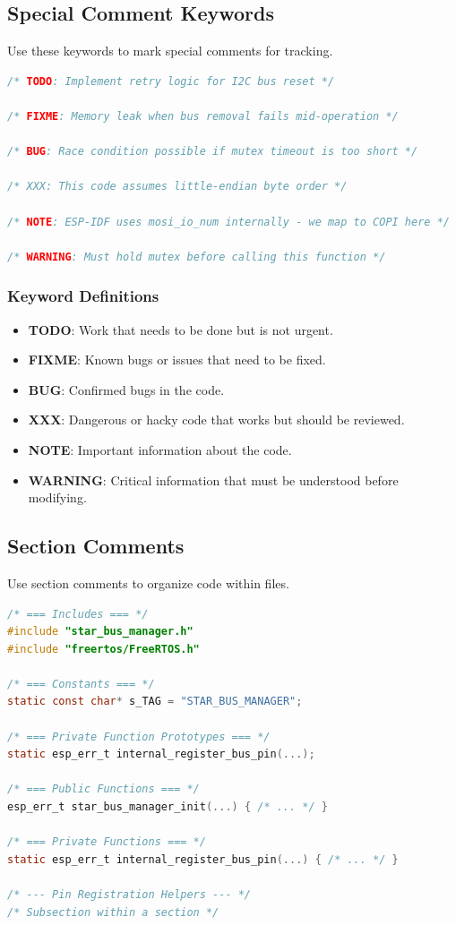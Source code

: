\subsection{Special Comment Keywords}

Use these keywords to mark special comments for tracking.

\begin{lstlisting}[language=C]
/* TODO: Implement retry logic for I2C bus reset */

/* FIXME: Memory leak when bus removal fails mid-operation */

/* BUG: Race condition possible if mutex timeout is too short */

/* XXX: This code assumes little-endian byte order */

/* NOTE: ESP-IDF uses mosi_io_num internally - we map to COPI here */

/* WARNING: Must hold mutex before calling this function */
\end{lstlisting}

\subsubsection{Keyword Definitions}

\begin{itemize}
    \item \textbf{TODO}: Work that needs to be done but is not urgent.
    \item \textbf{FIXME}: Known bugs or issues that need to be fixed.
    \item \textbf{BUG}: Confirmed bugs in the code.
    \item \textbf{XXX}: Dangerous or hacky code that works but should be reviewed.
    \item \textbf{NOTE}: Important information about the code.
    \item \textbf{WARNING}: Critical information that must be understood before modifying.
\end{itemize}

\subsection{Section Comments}

Use section comments to organize code within files.

\begin{lstlisting}[language=C]
/* === Includes === */
#include "star_bus_manager.h"
#include "freertos/FreeRTOS.h"

/* === Constants === */
static const char* s_TAG = "STAR_BUS_MANAGER";

/* === Private Function Prototypes === */
static esp_err_t internal_register_bus_pin(...);

/* === Public Functions === */
esp_err_t star_bus_manager_init(...) { /* ... */ }

/* === Private Functions === */
static esp_err_t internal_register_bus_pin(...) { /* ... */ }

/* --- Pin Registration Helpers --- */
/* Subsection within a section */
\end{lstlisting}

